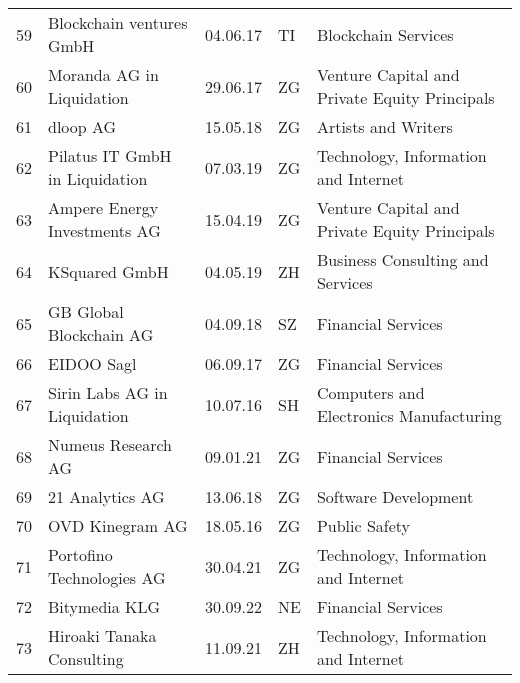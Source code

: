 \begin{tabular}{lllll}
59  &                           Blockchain ventures GmbH &      04.06.17 &     TI &                            Blockchain Services \\
60  &                          Moranda AG in Liquidation &      29.06.17 &     ZG &  Venture Capital and Private Equity Principals \\
61  &                                           dloop AG &      15.05.18 &     ZG &                            Artists and Writers \\
62  &                     Pilatus IT GmbH in Liquidation &      07.03.19 &     ZG &           Technology, Information and Internet \\
63  &                       Ampere Energy Investments AG &      15.04.19 &     ZG &  Venture Capital and Private Equity Principals \\
64  &                                      KSquared GmbH &      04.05.19 &     ZH &               Business Consulting and Services \\
65  &                            GB Global Blockchain AG &      04.09.18 &     SZ &                             Financial Services \\
66  &                                         EIDOO Sagl &      06.09.17 &     ZG &                             Financial Services \\
67  &                       Sirin Labs AG in Liquidation &      10.07.16 &     SH &        Computers and Electronics Manufacturing \\
68  &                                 Numeus Research AG &      09.01.21 &     ZG &                             Financial Services \\
69  &                                    21 Analytics AG &      13.06.18 &     ZG &                           Software Development \\
70  &                                    OVD Kinegram AG &      18.05.16 &     ZG &                                  Public Safety \\
71  &                          Portofino Technologies AG &      30.04.21 &     ZG &           Technology, Information and Internet \\
72  &                                      Bitymedia KLG &      30.09.22 &     NE &                             Financial Services \\
73  &                          Hiroaki Tanaka Consulting &      11.09.21 &     ZH &           Technology, Information and Internet \\

\end{tabular}
